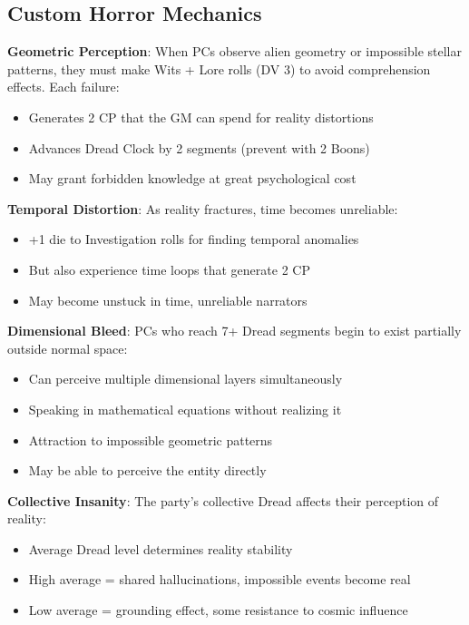 \documentclass[11pt]{article}
\begin{document}
\subsection*{Custom Horror Mechanics}

\begin{mdframed}[backgroundcolor=sanitybg]
\textbf{Geometric Perception}: When PCs observe alien geometry or impossible stellar patterns, they must make Wits + Lore rolls (DV 3) to avoid comprehension effects. Each failure:
\begin{itemize}[leftmargin=*]
\item Generates 2 CP that the GM can spend for reality distortions
\item Advances Dread Clock by 2 segments (prevent with 2 Boons)
\item May grant forbidden knowledge at great psychological cost
\end{itemize}

\textbf{Temporal Distortion}: As reality fractures, time becomes unreliable:
\begin{itemize}[leftmargin=*]
\item +1 die to Investigation rolls for finding temporal anomalies
\item But also experience time loops that generate 2 CP
\item May become unstuck in time, unreliable narrators
\end{itemize}

\textbf{Dimensional Bleed}: PCs who reach 7+ Dread segments begin to exist partially outside normal space:
\begin{itemize}[leftmargin=*]
\item Can perceive multiple dimensional layers simultaneously
\item Speaking in mathematical equations without realizing it
\item Attraction to impossible geometric patterns
\item May be able to perceive the entity directly
\end{itemize}

\textbf{Collective Insanity}: The party's collective Dread affects their perception of reality:
\begin{itemize}[leftmargin=*]
\item Average Dread level determines reality stability
\item High average = shared hallucinations, impossible events become real
\item Low average = grounding effect, some resistance to cosmic influence
\end{itemize}
\end{mdframed}
\end{document}
